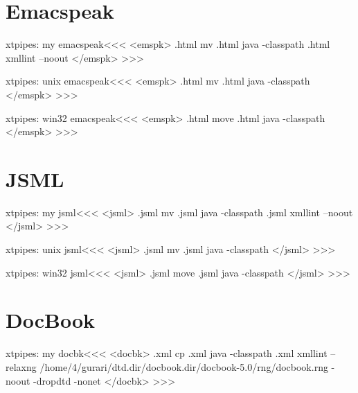 \documentclass{article}
\begin{document}
\section{Emacspeak}

\<xtpipes: my emacspeak\><<<
<emspk>
.html mv %
.html java -classpath %
.html xmllint --noout %
</emspk>
>>>


\<xtpipes: unix emacspeak\><<<
<emspk>
.html mv %
.html java -classpath  %
</emspk>
>>>


\<xtpipes: win32 emacspeak\><<<
<emspk>
.html move %
.html java -classpath  %
</emspk>
>>>


\section{JSML}

\<xtpipes: my jsml\><<<
<jsml>
.jsml mv %
.jsml java -classpath %
.jsml xmllint --noout %
</jsml>
>>>


\<xtpipes: unix jsml\><<<
<jsml>
.jsml mv %
.jsml java -classpath %
</jsml>
>>>


\<xtpipes: win32 jsml\><<<
<jsml>
.jsml move %
.jsml java -classpath %
</jsml>
>>>







\section{DocBook}

\<xtpipes: my docbk\><<<
<docbk>
.xml cp %
.xml java -classpath %
.xml xmllint --relaxng /home/4/gurari/dtd.dir/docbook.dir/docbook-5.0/rng/docbook.rng -noout -dropdtd -nonet %
</docbk>
>>>
\end{document}
